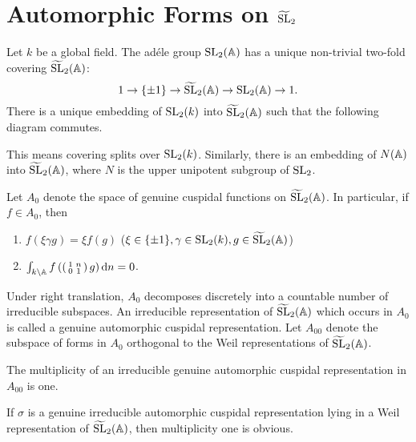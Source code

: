 \section{Automorphic Forms on $\widetilde{\mathrm{SL}}_2$}
\label{sec:1}

Let $k$ be a global field.
The ad\'ele group $\mathrm{SL}_2(\mathbb{A})$ has a unique non-trivial two-fold covering $\widetilde{\mathrm{SL}}_2(\mathbb{A})$:
\[
1 \to \{\pm 1\} \to \widetilde{\mathrm{SL}}_2(\mathbb{A}) \to \mathrm{SL}_2(\mathbb{A}) \to 1.
\]
There is a unique embedding of $\mathrm{SL}_2(k)$ into $\widetilde{\mathrm{SL}}_2(\mathbb{A})$ such that the following diagram commutes.

\begin{center}
\end{center}

This means covering splits over $\mathrm{SL}_2(k)$.
Similarly, there is an embedding of $N(\mathbb{A})$ into $\widetilde{\mathrm{SL}}_2(\mathbb{A})$, where $N$ is the upper unipotent subgroup of $\mathrm{SL}_2$.

Let $A_0$ denote the space of genuine cuspidal functions on $\widetilde{\mathrm{SL}}_2(\mathbb{A})$.
In particular, if $f \in A_0$, then

\begin{enumerate}[label=\roman*)]
    \item $f(\xi \gamma g) = \xi f(g)$ \qquad ($\xi \in \{ \pm 1 \}, \gamma \in \mathrm{SL}_2(k), g \in \widetilde{\mathrm{SL}}_2(\mathbb{A})$)
    \item $\int_{k\backslash \mathbb{A}} f\left(\left(\begin{smallmatrix}
        1 & n \\ 0 & 1
    \end{smallmatrix}\right)g\right) \mathrm{d} n = 0$.
\end{enumerate}

Under right translation, $A_0$ decomposes discretely into a countable number of irreducible subspaces.
An irreducible representation of $\widetilde{\mathrm{SL}}_2(\mathbb{A})$ which occurs in $A_0$ is called a genuine automorphic cuspidal
representation.
Let $A_{00}$ denote the subspace of forms in $A_0$ orthogonal to the Weil representations of $\widetilde{\mathrm{SL}}_2(\mathbb{A})$.

\begin{theorem}
The multiplicity of an irreducible genuine automorphic cuspidal representation in $A_{00}$ is one.
\end{theorem}
\begin{remark*}
If $\sigma$ is a genuine irreducible automorphic cuspidal representation lying in a Weil representation of $\widetilde{\mathrm{SL}}_2(\mathbb{A})$, then multiplicity one is obvious.
\end{remark*}

